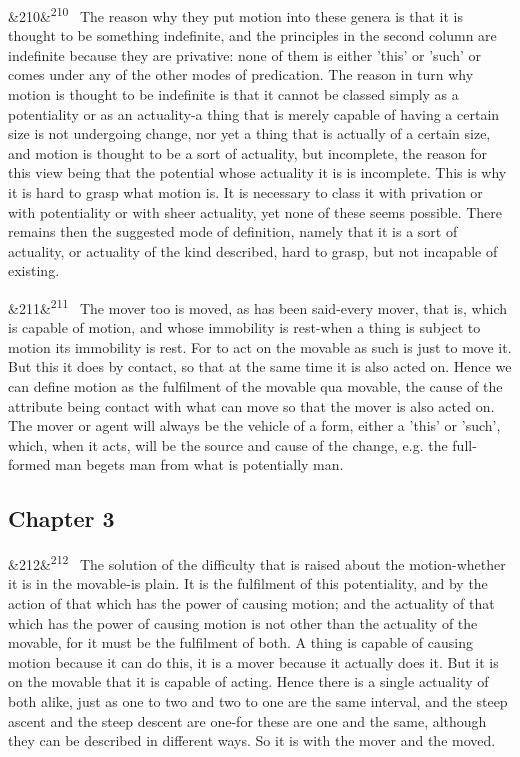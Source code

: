 \documentclass[12pt]{article}
\newcommand{\para}[1][]{\par\noindent\ifx&#1&\else\textsuperscript{\footnotesize #1}~\fi}
\begin{document}
\para[210] The reason why they put motion into these genera is that it is thought to be something indefinite, and the principles in the second column are indefinite because they are privative: none of them is either 'this' or 'such' or comes under any of the other modes of predication. The reason in turn why motion is thought to be indefinite is that it cannot be classed simply as a potentiality or as an actuality-a thing that is merely capable of having a certain size is not undergoing change, nor yet a thing that is actually of a certain size, and motion is thought to be a sort of actuality, but incomplete, the reason for this view being that the potential whose actuality it is is incomplete. This is why it is hard to grasp what motion is. It is necessary to class it with privation or with potentiality or with sheer actuality, yet none of these seems possible. There remains then the suggested mode of definition, namely that it is a sort of actuality, or actuality of the kind described, hard to grasp, but not incapable of existing.

\para[211] The mover too is moved, as has been said-every mover, that is, which is capable of motion, and whose immobility is rest-when a thing is subject to motion its immobility is rest. For to act on the movable as such is just to move it. But this it does by contact, so that at the same time it is also acted on. Hence we can define motion as the fulfilment of the movable qua movable, the cause of the attribute being contact with what can move so that the mover is also acted on. The mover or agent will always be the vehicle of a form, either a 'this' or 'such', which, when it acts, will be the source and cause of the change, e.g. the full-formed man begets man from what is potentially man.

\subsection*{Chapter 3}

\para[212] The solution of the difficulty that is raised about the motion-whether it is in the movable-is plain. It is the fulfilment of this potentiality, and by the action of that which has the power of causing motion; and the actuality of that which has the power of causing motion is not other than the actuality of the movable, for it must be the fulfilment of both. A thing is capable of causing motion because it can do this, it is a mover because it actually does it. But it is on the movable that it is capable of acting. Hence there is a single actuality of both alike, just as one to two and two to one are the same interval, and the steep ascent and the steep descent are one-for these are one and the same, although they can be described in different ways. So it is with the mover and the moved.
\end{document}
